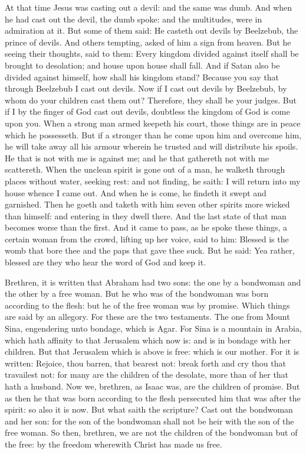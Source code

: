 \begin{multicols}{2}
At that time Jesus was casting out a devil: and the same was dumb. And when he had cast out
the devil, the dumb spoke: and the multitudes, were in admiration at it.  But
some of them said: He casteth out devils by Beelzebub, the prince of devils.
And others tempting, asked of him a sign from heaven.  But he seeing their
thoughts, said to them: Every kingdom divided against itself shall be brought
to desolation; and house upon house shall fall.  And if Satan also be divided
against himself, how shall his kingdom stand? Because you say that through
Beelzebub I cast out devils.  Now if I cast out devils by Beelzebub, by whom do
your children cast them out? Therefore, they shall be your judges.  But if I by
the finger of God cast out devils, doubtless the kingdom of God is come upon
you.  When a strong man armed keepeth his court, those things are in peace
which he possesseth.  But if a stronger than he come upon him and overcome him,
he will take away all his armour wherein he trusted and will distribute his
spoils.  He that is not with me is against me; and he that gathereth not with
me scattereth.  When the unclean spirit is gone out of a man, he walketh
through places without water, seeking rest: and not finding, he saith: I will
return into my house whence I came out.  And when he is come, he findeth it
swept and garnished.  Then he goeth and taketh with him seven other spirits
more wicked than himself: and entering in they dwell there. And the last state
of that man becomes worse than the first.  And it came to pass, as he spoke
these things, a certain woman from the crowd, lifting up her voice, said to
him: Blessed is the womb that bore thee and the paps that gave thee suck.  But
he said: Yea rather, blessed are they who hear the word of God and keep it.


\bigskip



Brethren, it is written that Abraham had two sons: the one by a bondwoman and the
other by a free woman.  But he who was of the bondwoman was born according to
the flesh: but he of the free woman was by promise.  Which things are said by
an allegory. For these are the two testaments. The one from Mount Sina,
engendering unto bondage, which is Agar.  For Sina is a mountain in Arabia,
which hath affinity to that Jerusalem which now is: and is in bondage with her
children.  But that Jerusalem which is above is free: which is our mother.  For
it is written: Rejoice, thou barren, that bearest not: break forth and cry thou
that travailest not: for many are the children of the desolate, more than of
her that hath a husband.  Now we, brethren, as Isaac was, are the children of
promise.  But as then he that was born according to the flesh persecuted him
that was after the spirit: so also it is now.  But what saith the scripture?
Cast out the bondwoman and her son: for the son of the bondwoman shall not be
heir with the son of the free woman.  So then, brethren, we are not the
children of the bondwoman but of the free: by the freedom wherewith Christ has
made us free.


\end{multicols}
